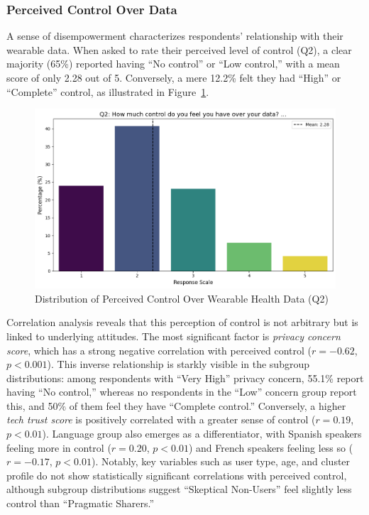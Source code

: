 	\subsubsection{Perceived Control Over Data}
		A sense of disempowerment characterizes respondents' relationship with their wearable data. When asked to rate their perceived level of control (Q2), a clear majority (65\%) reported having ``No control'' or ``Low control,'' with a mean score of only 2.28 out of 5. Conversely, a mere 12.2\% felt they had ``High'' or ``Complete'' control, as illustrated in Figure~\ref{fig:perceived_control_q2}.
		\begin{figure}
			\centering
			\includegraphics[width=0.7\linewidth]{figures/questions/Q2_likert.png}
			\caption{Distribution of Perceived Control Over Wearable Health Data (Q2)}
			\label{fig:perceived_control_q2}
		\end{figure}
		Correlation analysis reveals that this perception of control is not arbitrary but is linked to underlying attitudes. The most significant factor is \textit{privacy concern score}, which has a strong negative correlation with perceived control ($r = -0.62$, $p < 0.001$). This inverse relationship is starkly visible in the subgroup distributions: among respondents with ``Very High'' privacy concern, 55.1\% report having ``No control,'' whereas no respondents in the ``Low'' concern group report this, and 50\% of them feel they have ``Complete control.''
		Conversely, a higher \textit{tech trust score} is positively correlated with a greater sense of control ($r = 0.19$, $p < 0.01$). Language group also emerges as a differentiator, with Spanish speakers feeling more in control ($r = 0.20$, $p < 0.01$) and French speakers feeling less so ($r = -0.17$, $p < 0.01$). Notably, key variables such as user type, age, and cluster profile do not show statistically significant correlations with perceived control, although subgroup distributions suggest ``Skeptical Non-Users'' feel slightly less control than ``Pragmatic Sharers.''
